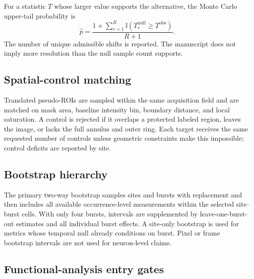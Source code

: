 For a statistic $T$ whose larger value supports the alternative, the Monte Carlo upper-tail probability is
\begin{equation}
  \hat p = \frac{1+\sum_{r=1}^{R}\mathbb I(T_r^{\mathrm{null}}\ge T^{\mathrm{obs}})}{R+1}.
\end{equation}
The number of unique admissible shifts is reported. The manuscript does not imply more resolution than the null sample count supports.

\subsection{Spatial-control matching}

Translated pseudo-ROIs are sampled within the same acquisition field and are matched on mask area, baseline intensity bin, boundary distance, and local saturation. A control is rejected if it overlaps a protected labeled region, leaves the image, or lacks the full annulus and outer ring. Each target receives the same requested number of controls unless geometric constraints make this impossible; control deficits are reported by site.

\subsection{Bootstrap hierarchy}

The primary two-way bootstrap samples sites and bursts with replacement and then includes all available occurrence-level measurements within the selected site--burst cells. With only four bursts, intervals are supplemented by leave-one-burst-out estimates and all individual burst effects. A site-only bootstrap is used for metrics whose temporal null already conditions on burst. Pixel or frame bootstrap intervals are not used for neuron-level claims.

\subsection{Functional-analysis entry gates}

